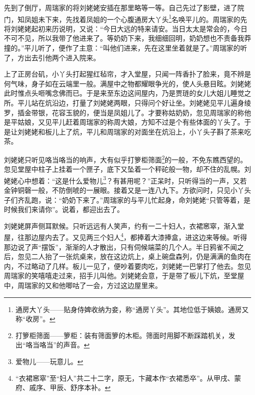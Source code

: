 \par 先到了倒厅，周瑞家的将刘姥姥安插在那里略等一等。自己先过了影壁，进了院门，知凤姐未下来，先找着凤姐的一个心腹通房大丫头\footnote{通房大丫头——贴身侍婢收纳为妾，称“通房丫头”。其地位低于姨娘。通房又称“收房”。}名唤平儿的。周瑞家的先将刘姥姥起初来历说明，又说：“今日大远的特来请安。当日太太是常会的，今日不可不见，所以我带了他进来了。等奶奶下来，我细细回明，奶奶想也不责备我莽撞的。”平儿听了，便作了主意：“叫他们进来，先在这里坐着就是了。”周瑞家的听了，方出去引他两个进入院来。
\par 上了正房台矶，小丫头打起猩红毡帘，才入堂屋，只闻一阵香扑了脸来，竟不辨是何气味，身子如在云端里一般。满屋中之物都耀眼争光的，使人头悬目眩。刘姥姥此时惟点头咂嘴念佛而已。于是来至东边这间屋内，乃是贾琏的女儿大姐儿睡觉之所。平儿站在炕沿边，打量了刘姥姥两眼，只得问个好让坐。刘姥姥见平儿遍身绫罗，插金带银，花容玉貌的，便当是凤姐儿了。才要称姑奶奶，忽见周瑞家的称他是平姑娘，又见平儿赶着周瑞家的称周大娘，方知不过是个有些体面的丫头了。于是让刘姥姥和板儿上了炕，平儿和周瑞家的对面坐在炕沿上，小丫头子斟了茶来吃茶。
\par 刘姥姥只听见咯当咯当的响声，大有似乎打箩柜筛面\footnote{打箩柜筛面——箩柜：装有筛面箩的木柜。筛面时用脚不断踩踏机关，发出“咯当咯当”的声音。}的一般，不免东瞧西望的。忽见堂屋中柱子上挂着一个匣子，底下又坠着一个秤砣般一物，却不住的乱幌。刘姥姥心中想着：“这是什么爱物儿\footnote{爱物儿——玩意儿。}？有甚用呢？”正呆时，只听得当的一声，又若金钟铜磬一般，不防倒唬的一展眼。接着又是一连八九下。方欲问时，只见小丫头子们齐乱跑，说：“奶奶下来了。”周瑞家的与平儿忙起身，命刘姥姥“只管等着，是时候我们来请你”。说着，都迎出去了。
\par 刘姥姥屏声侧耳默候。只听远远有人笑声，约有一二十妇人，衣裙窸窣，渐入堂屋，往那边屋内去了。又见两三个妇人\footnote{“衣裙窸窣”至“妇人”共二十二字，原无，卞藏本作“衣裙悉卒”。从甲戌、蒙府、戚序、甲辰、舒序本补。}，都捧着大漆捧盒，进这边来等候。听得那边说了声“摆饭”，渐渐的人才散出，只有伺候端菜的几个人。半日鸦雀不闻之后，忽见二人抬了一张炕桌来，放在这边炕上，桌上碗盘森列，仍是满满的鱼肉在内，不过略动了几样。板儿一见了，便吵着要肉吃，刘姥姥一巴掌打了他去。忽见周瑞家的笑嘻嘻走过来，招手儿叫他。刘姥姥会意，于是带了板儿下炕，至堂屋中，周瑞家的又和他唧咕了一会，方过这边屋里来。
